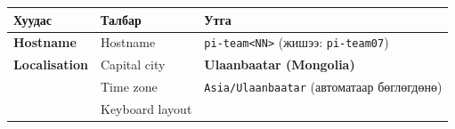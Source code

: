 \begin{enumerate}
  \begingroup\scriptsize\begin{longtable}[]{@{}lll@{}}
  \toprule
  \begin{minipage}[b]{0.30\columnwidth}\raggedright
  Хуудас\strut
  \end{minipage} & \begin{minipage}[b]{0.30\columnwidth}\raggedright
  Талбар\strut
  \end{minipage} & \begin{minipage}[b]{0.30\columnwidth}\raggedright
  Утга\strut
  \end{minipage}\tabularnewline
  \midrule
  \endhead
  \begin{minipage}[t]{0.30\columnwidth}\raggedright
  \textbf{Hostname}\strut
  \end{minipage} & \begin{minipage}[t]{0.30\columnwidth}\raggedright
  Hostname\strut
  \end{minipage} & \begin{minipage}[t]{0.30\columnwidth}\raggedright
  \texttt{pi-team\textless{}NN\textgreater{}} (жишээ: \texttt{pi-team07})\strut
  \end{minipage}\tabularnewline
  \begin{minipage}[t]{0.30\columnwidth}\raggedright
  \textbf{Localisation}\strut
  \end{minipage} & \begin{minipage}[t]{0.30\columnwidth}\raggedright
  Capital city\strut
  \end{minipage} & \begin{minipage}[t]{0.30\columnwidth}\raggedright
  \textbf{Ulaanbaatar (Mongolia)}\strut
  \end{minipage}\tabularnewline
  \begin{minipage}[t]{0.30\columnwidth}\raggedright
  \strut
  \end{minipage} & \begin{minipage}[t]{0.30\columnwidth}\raggedright
  Time zone\strut
  \end{minipage} & \begin{minipage}[t]{0.30\columnwidth}\raggedright
  \texttt{Asia/Ulaanbaatar} (автоматаар бөглөгдөнө)\strut
  \end{minipage}\tabularnewline
  \begin{minipage}[t]{0.30\columnwidth}\raggedright
  \strut
  \end{minipage} & \begin{minipage}[t]{0.30\columnwidth}\raggedright
  Keyboard layout\strut
  \end{minipage} & \begin{minipage}[t]{0.30\columnwidth}\raggedright

\end{minipage}
\end{longtable}
\end{enumerate}
